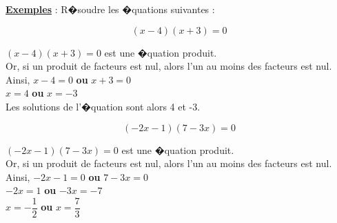 \documentclass[a4paper,10pt,twoside,french]{article}
\begin{document}
\newpage

\underline{\textbf{Exemples}} : R�soudre les �quations suivantes : 

$$ (x-4)(x+3)=0$$

\color{red}

$ (x-4)(x+3)=0$ est une �quation produit.\\

Or, si un produit de facteurs est nul, alors l'un au moins des facteurs est nul.\\

Ainsi, \hspace*{0.6cm} $x-4 = 0$ \hspace*{1cm} \textbf{ou} \hspace*{1cm}$x+3 = 0$\\

\hspace*{1.6cm} $x= 4$ \hspace*{1.5cm} \textbf{ou} \hspace*{1cm}$x = -3$\\



Les solutions de l'�quation sont alors 4 et -3.\\


\color{black}


 $$ (-2x-1)(7-3x)=0$$
 
 \color{red}
 
 
 $ (-2x-1)(7-3x)=0$ est une �quation produit.\\

Or, si un produit de facteurs est nul, alors l'un au moins des facteurs est nul.\\

Ainsi, \hspace*{0.6cm} $-2x-1 = 0$ \hspace*{1cm} \textbf{ou} \hspace*{1cm}$7-3x = 0$\\

\hspace*{1.6cm} $-2x= 1$ \hspace*{1.5cm} \textbf{ou} \hspace*{1cm}$-3x = -7$\\

\hspace*{1.6cm} $x= -\dfrac{1}{2}$ \hspace*{1.5cm} \textbf{ou} \hspace*{1cm}$x = \dfrac{7}{3}$\\
\end{document}
